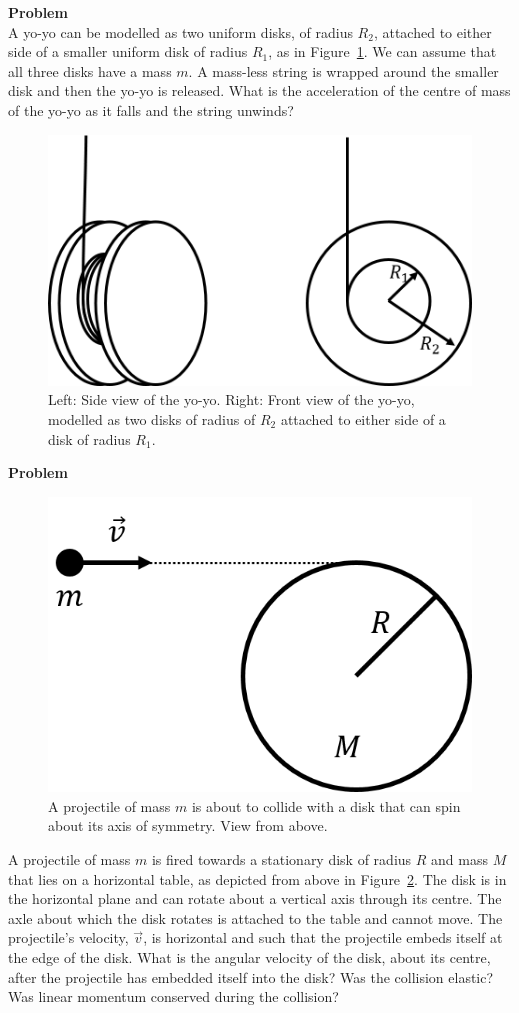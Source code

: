 \begin{framed}
\textbf{Problem}\\
A yo-yo can be modelled as two uniform disks, of radius $R_2$, attached to either side of a smaller uniform disk of radius $R_1$, as in Figure~\ref{fig:angularmomentumrolling:yoyo}. We can assume that all three disks have a mass $m$. A mass-less string is wrapped around the smaller disk and then the yo-yo is released. What is the acceleration of the centre of mass of the yo-yo as it falls and the string unwinds?

\begin{figure}[!htbp]
\centering
\includegraphics[width=0.5\linewidth]{files/yoyo-8fcc3b35b0626567c8d6c678f4922917.png}
\caption[]{Left: Side view of the yo-yo. Right: Front view of the yo-yo, modelled as two disks of radius of $R_2$ attached to either side of a disk of radius $R_1$.}
\label{fig:angularmomentumrolling:yoyo}
\end{figure}
\end{framed}

\begin{framed}
\textbf{Problem}\\
\begin{figure}[!htbp]
\centering
\includegraphics[width=0.3\linewidth]{files/balldisk-68702f5e17e23a584057698b0fa628f4.png}
\caption[]{A projectile of mass $m$ is about to collide with a disk that can spin about its axis of symmetry. View from above.}
\label{fig:angularmomentumrolling:balldisk}
\end{figure}

A projectile of mass $m$ is fired towards a stationary disk of radius $R$ and mass $M$ that lies on a horizontal table, as depicted from above in Figure~\ref{fig:angularmomentumrolling:balldisk}. The disk is in the horizontal plane and can rotate about a vertical axis through its centre. The axle about which the disk rotates is attached to the table and cannot move. The projectile's velocity, $\vec v$, is horizontal and such that the projectile embeds itself at the edge of the disk.  What is the angular velocity of the disk, about its centre, after the projectile has embedded itself into the disk? Was the collision elastic? Was linear momentum conserved during the collision?
\end{framed}

